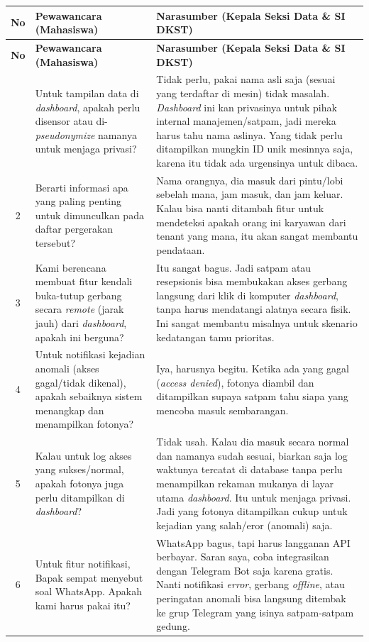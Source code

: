 \begin{longtable}{|c|p{}|p{}|}
\hline
\textbf{No} & \textbf{Pewawancara (Mahasiswa)} & \textbf{Narasumber (Kepala Seksi Data \& SI DKST)} \\ \hline
\endfirsthead
\hline
\textbf{No} & \textbf{Pewawancara (Mahasiswa)} & \textbf{Narasumber (Kepala Seksi Data \& SI DKST)} \\ \hline
\endhead
\hline
\endfoot
\hline
\endlastfoot
1 & Untuk tampilan data di \textit{dashboard}, apakah perlu disensor atau di-\textit{pseudonymize} namanya untuk menjaga privasi? & Tidak perlu, pakai nama asli saja (sesuai yang terdaftar di mesin) tidak masalah. \textit{Dashboard} ini kan privasinya untuk pihak internal manajemen/satpam, jadi mereka harus tahu nama aslinya. Yang tidak perlu ditampilkan mungkin ID unik mesinnya saja, karena itu tidak ada urgensinya untuk dibaca. \\ \hline
2 & Berarti informasi apa yang paling penting untuk dimunculkan pada daftar pergerakan tersebut? & Nama orangnya, dia masuk dari pintu/lobi sebelah mana, jam masuk, dan jam keluar. Kalau bisa nanti ditambah fitur untuk mendeteksi apakah orang ini karyawan dari tenant yang mana, itu akan sangat membantu pendataan. \\ \hline
3 & Kami berencana membuat fitur kendali buka-tutup gerbang secara \textit{remote} (jarak jauh) dari \textit{dashboard}, apakah ini berguna? & Itu sangat bagus. Jadi satpam atau resepsionis bisa membukakan akses gerbang langsung dari klik di komputer \textit{dashboard}, tanpa harus mendatangi alatnya secara fisik. Ini sangat membantu misalnya untuk skenario kedatangan tamu prioritas. \\ \hline
4 & Untuk notifikasi kejadian anomali (akses gagal/tidak dikenal), apakah sebaiknya sistem menangkap dan menampilkan fotonya? & Iya, harusnya begitu. Ketika ada yang gagal (\textit{access denied}), fotonya diambil dan ditampilkan supaya satpam tahu siapa yang mencoba masuk sembarangan. \\ \hline
5 & Kalau untuk log akses yang sukses/normal, apakah fotonya juga perlu ditampilkan di \textit{dashboard}? & Tidak usah. Kalau dia masuk secara normal dan namanya sudah sesuai, biarkan saja log waktunya tercatat di database tanpa perlu menampilkan rekaman mukanya di layar utama \textit{dashboard}. Itu untuk menjaga privasi. Jadi yang fotonya ditampilkan cukup untuk kejadian yang salah/eror (anomali) saja. \\ \hline
6 & Untuk fitur notifikasi, Bapak sempat menyebut soal WhatsApp. Apakah kami harus pakai itu? & WhatsApp bagus, tapi harus langganan API berbayar. Saran saya, coba integrasikan dengan Telegram Bot saja karena gratis. Nanti notifikasi \textit{error}, gerbang \textit{offline}, atau peringatan anomali bisa langsung ditembak ke grup Telegram yang isinya satpam-satpam gedung. \\ \hline

\end{longtable}
